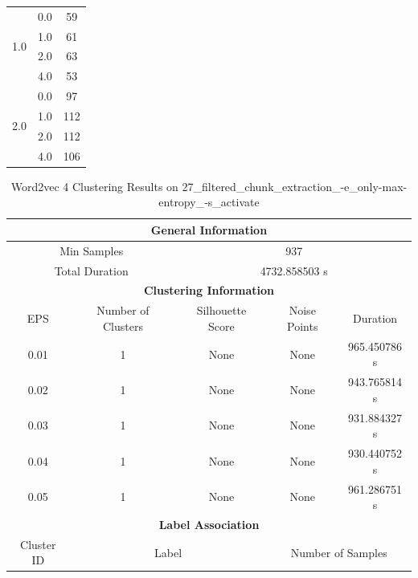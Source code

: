 \begin{longtable}{|c|c|c|c|c|}
\multirow{4}{*}{1.0} & \multicolumn{2}{c|}{0.0} & \multicolumn{2}{c|}{59} \\
& \multicolumn{2}{c|}{1.0} & \multicolumn{2}{c|}{61} \\
& \multicolumn{2}{c|}{2.0} & \multicolumn{2}{c|}{63} \\
& \multicolumn{2}{c|}{4.0} & \multicolumn{2}{c|}{53} \\
\hline
\multirow{4}{*}{2.0} & \multicolumn{2}{c|}{0.0} & \multicolumn{2}{c|}{97} \\
& \multicolumn{2}{c|}{1.0} & \multicolumn{2}{c|}{112} \\
& \multicolumn{2}{c|}{2.0} & \multicolumn{2}{c|}{112} \\
& \multicolumn{2}{c|}{4.0} & \multicolumn{2}{c|}{106} \\
\hline
\end{longtable}


\begin{longtable}{|c|c|c|c|c|}
\caption{Word2vec 4 Clustering Results on 27\_filtered\_chunk\_extraction\_-e\_only-max-entropy\_-s\_activate} \label{tab:27_filtered_chunk_extraction_-e_only-max-entropy_-s_activate_word2vec_4_clustering_results}\\
\hline
\multicolumn{5}{|c|}{\textbf{General Information}} \\
\hline
\multicolumn{2}{|c|}{Min Samples} & \multicolumn{3}{c|}{937} \\
\multicolumn{2}{|c|}{Total Duration} & \multicolumn{3}{c|}{4732.858503 s} \\
\hline
\multicolumn{5}{|c|}{\textbf{Clustering Information}} \\
\hline
EPS & Number of Clusters & Silhouette Score & Noise Points & Duration \\
0.01 & 1 & None & None & 965.450786 s\\
0.02 & 1 & None & None & 943.765814 s\\
0.03 & 1 & None & None & 931.884327 s\\
0.04 & 1 & None & None & 930.440752 s\\
0.05 & 1 & None & None & 961.286751 s\\
\hline
\multicolumn{5}{|c|}{\textbf{Label Association}} \\
\hline
Cluster ID & \multicolumn{2}{c|}{Label} & \multicolumn{2}{c|}{Number of Samples} \\
\hline
\end{longtable}


